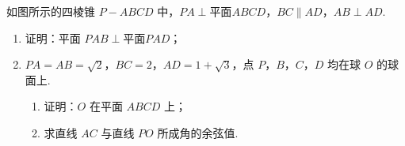 \documentclass[UTF8,a4paper,oneside,11pt]{ctexbook}
\begin{document}
\begin{problem}
如图所示的四棱锥 \(P - ABCD\) 中，\(PA \perp \text{平面} ABCD\)，\(BC \parallel AD\)，\(AB \perp AD\).

\begin{enumerate}
\item 证明：平面 \(PAB \perp \text{平面} PAD\)；
\item \(PA = AB = \sqrt{2}\)，\(BC = 2\)，\(AD = 1 + \sqrt{3}\)，点 \(P\)，\(B\)，\(C\)，\(D\) 均在球 \(O\) 的球面上.
\begin{enumerate}
\item 证明：\(O\) 在平面 \(ABCD\) 上；
\item 求直线 \(AC\) 与直线 \(PO\) 所成角的余弦值.
\end{enumerate}
\end{enumerate}

\end{problem}
\end{document}
